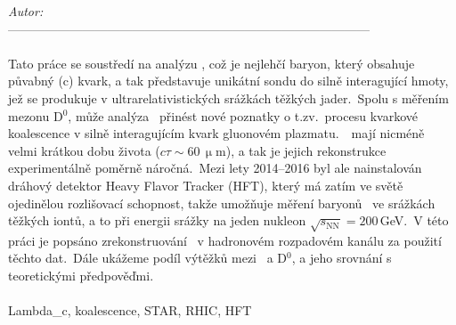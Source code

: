 \noindent
{\it Autor:} \myself\\
--------------------------------------------------------------------------------------- \\


 \\
Tato práce se soustředí na analýzu \Lambdac, což je nejlehčí baryon, který obsahuje půvabný (c) kvark, a tak představuje unikátní sondu do silně interagující hmoty, jež se produkuje v ultrarelativistických srážkách těžkých jader.\ Spolu s měřením mezonu D$^0$, může analýza \Lambdac\ přinést nové poznatky o t.zv.\ procesu kvarkové koalescence v silně interagujícím kvark gluonovém plazmatu.\ \Lambdac\ mají nicméně velmi krátkou dobu života ($c \tau \sim 60\,\upmu$m), a tak je jejich rekonstrukce experimentálně poměrně náročná.\ Mezi lety 2014--2016 byl ale nainstalován dráhový detektor Heavy Flavor Tracker (HFT), který má zatím ve světě ojedinělou rozlišovací schopnost, takže umožňuje měření baryonů \Lambdac\ ve srážkách těžkých iontů, a to při energii srážky na jeden nukleon $\sqrt{s_\mathrm{NN}} = 200\,$GeV.\ V této práci je popsáno zrekonstruování \Lambdac\ v hadronovém rozpadovém kanálu za použití těchto dat.\ Dále ukážeme podíl výtěžků mezi \Lambdac\ a D$^0$, a jeho srovnání s teoretickými předpověďmi.\\

 \\
Lambda\_c, koalescence, STAR, RHIC, HFT


%
